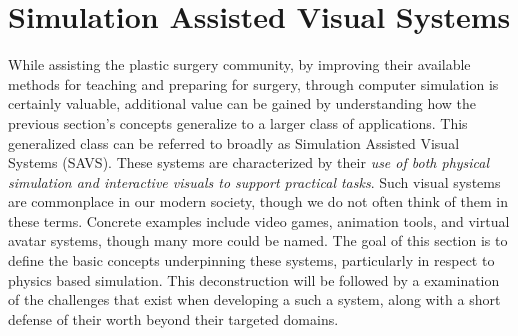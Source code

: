 



\section{Simulation Assisted Visual Systems}

While assisting the plastic surgery community, by improving their
available methods for teaching and preparing for surgery, through
computer simulation is certainly valuable, additional value can be
gained by understanding how the previous section's concepts generalize
to a larger class of applications. This generalized class can be
referred to broadly as Simulation Assisted Visual Systems
(SAVS). These systems are characterized by their \textit{use of both physical
simulation and interactive visuals to support practical tasks}. Such
visual systems are commonplace in our modern society, though we do
not often think of them in these terms. Concrete examples include
video games, animation tools, and virtual avatar systems, though many
more could be named. The goal of this section is to define the basic
concepts underpinning these systems, particularly in respect to physics
based simulation. This deconstruction will be followed by a
examination of the challenges that exist when developing a such a system,
along with a short defense of their worth beyond their targeted
domains.

